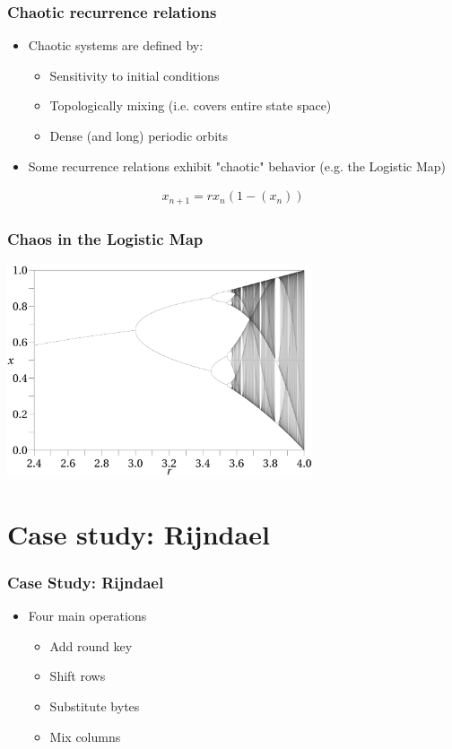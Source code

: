 \documentclass[handout]{beamer}
\begin{document}
\begin{frame}
	\frametitle{Chaotic recurrence relations}
	\begin{itemize}
		\item Chaotic systems are defined by:
		\begin{itemize}
			\item Sensitivity to initial conditions 
			\item Topologically mixing (i.e. covers entire state space)
			\item Dense (and long) periodic orbits 
		\end{itemize}
		\item Some recurrence relations exhibit "chaotic" behavior (e.g. the Logistic Map)
	\end{itemize}
	\begin{eqnarray*}
		x_{n+1} = rx_{n}(1 - (x_{n}))
		\label{logisticmap}
	\end{eqnarray*}
\end{frame}

\begin{frame}
	\frametitle{Chaos in the Logistic Map}
	\begin{center}
      		\includegraphics[width=90mm]{images/logistic_bifurcation.png}
	\end{center}
\end{frame}

\section{Case study: Rijndael}
\begin{frame}
	\frametitle{Case Study: Rijndael}
	\begin{itemize}
		\item Four main operations
		\begin{itemize}
			\item Add round key
			\item Shift rows
			\item Substitute bytes
			\item Mix columns
		\end{itemize}
	\end{itemize}
\end{frame}
\end{document}
